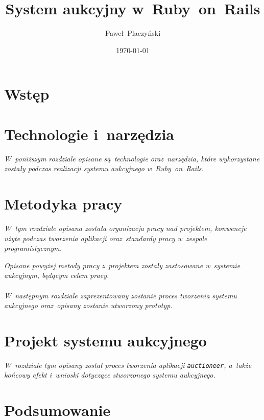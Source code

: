 \documentclass[11pt,oneside]{book}
\author{Paweł~Placzyński}
\title{System aukcyjny w~Ruby~on~Rails}
\date{\today}
\begin{document}
\tableofcontents

\chapter{Wstęp}



\chapter{Technologie i~narzędzia}

\textit{W~poniższym rozdziale opisane są~technologie oraz~narzędzia, które wykorzystane zostały podczas realizacji systemu aukcyjnego w~Ruby~on~Rails.}





\chapter{Metodyka pracy}

\textit{W~tym rozdziale opisana została organizacja pracy nad projektem, konwencje użyte podczas tworzenia aplikacji oraz~standardy pracy w~zespole programistycznym.}





\textit{Opisane powyżej metody pracy z~projektem zostały zastosowane w~systemie aukcyjnym, będącym celem pracy.\\\\W~następnym rozdziale zaprezentowany zostanie proces tworzenia systemu aukcyjnego oraz~opisany zostanie utworzony prototyp.}

\chapter{Projekt systemu aukcyjnego}

\textit{W~rozdziale tym opisany został proces tworzenia aplikacji \texttt{auctioneer}, a~także końcowy efekt i~wnioski dotyczące stworzonego systemu aukcyjnego.}







\chapter{Podsumowanie}



\listoffigures


\end{document}
